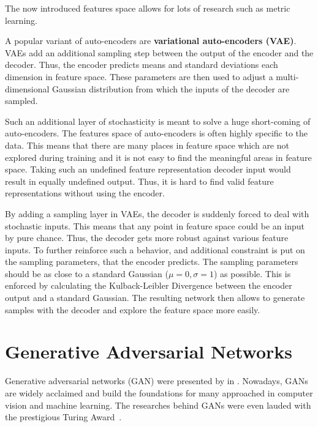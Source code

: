 The now introduced features space allows for lots of research such as metric learning.

A popular variant of auto-encoders are \textbf{variational auto-encoders (VAE)}.
VAEs add an additional sampling step between the output of the encoder and the decoder.
Thus, the encoder predicts means and standard deviations each dimension in feature space.
These parameters are then used to adjust a multi-dimensional Gaussian distribution from which the inputs of the decoder are sampled.

Such an additional layer of stochasticity is meant to solve a huge short-coming of auto-encoders.
The features space of auto-encoders is often highly specific to the data.
This means that there are many places in feature space which are not explored during training and it is not easy to find the meaningful areas in feature space.
Taking such an undefined feature representation decoder input would result in equally undefined output.
Thus, it is hard to find valid feature representations without using the encoder.

By adding a sampling layer in VAEs, the decoder is suddenly forced to deal with stochastic inputs.
This means that any point in feature space could be an input by pure chance.
Thus, the decoder gets more robust against various feature inputs.
To further reinforce such a behavior, and additional constraint is put on the sampling parameters, that the encoder predicts.
The sampling parameters should be as close to a standard Gaussian ($\mu = 0, \sigma = 1$) as possible.
This is enforced by calculating the Kulback-Leibler Divergence between the encoder output and a standard Gaussian.
The resulting network then allows to generate samples with the decoder and explore the feature space more easily.

\section{Generative Adversarial Networks}
Generative adversarial networks (GAN) were presented by \citeauthor*{GAN} in \citeyear{GAN}\cite{GAN}.
Nowadays, GANs are widely acclaimed and build the foundations for many approached in computer vision and machine learning.
The researches behind GANs were even lauded with the prestigious Turing Award~\cite{turingaward}.

